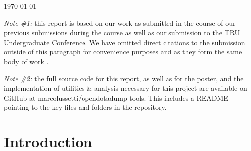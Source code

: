 \begin{titlepage}
	
	
	\vfill\vfill\vfill %
	
	{\large\today} %
	
	
	 
	
	\vfill %
	
\end{titlepage}


\addtocounter{page}{1} %

\emph{Note \#1:} this report is based on our work as submitted in the course of our previous submissions during the course as well as our submission to the TRU Undergraduate Conference. We have omitted direct citations to the submission outside of this paragraph for convenience purposes and as they form the same body of work \cite{lussettiBigDataReduction2019}.

\emph{Note \#2:} the full source code for this report, as well as for the poster, and the implementation of utilities \& analysis necessary for this project are available on GitHub at \href{https://github.com/marcolussetti/opendotadump-tools}{marcolussetti/opendotadump-tools}. This includes a README pointing to the key files and folders in the repository.

\section{Introduction} %

